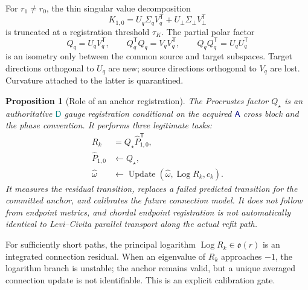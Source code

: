 \documentclass[10pt,twocolumn]{article}
\newtheorem{proposition}[theorem]{Proposition}
\theoremstyle{definition}
\theoremstyle{remark}
\newcommand{\Log}{\operatorname{Log}}
\newcommand{\status}[2]{\textcolor{#1}{\ensuremath{\boxed{\mathsf{#2}}}}}
\begin{document}
For $r_1\ne r_0$, the thin singular value decomposition
\begin{equation}
 K_{1,0}=U_q\Sigma_qV_q^{\mathsf T}+U_\perp\Sigma_\perp V_\perp^{\mathsf T}
 \label{eq:rectsvd}
\end{equation}
is truncated at a registration threshold $\tau_K$.  The partial polar factor
\begin{equation}
 Q_q=U_qV_q^{\mathsf T},\qquad
 Q_q^{\mathsf T}Q_q=V_qV_q^{\mathsf T},\qquad
 Q_qQ_q^{\mathsf T}=U_qU_q^{\mathsf T}
 \label{eq:partialpolar}
\end{equation}
is an isometry only between the common source and target subspaces.  Target directions orthogonal to $U_q$ are new; source directions orthogonal to $V_q$ are lost.  Curvature attached to the latter is quarantined.

\begin{proposition}[Role of an anchor registration]
The Procrustes factor $Q_\star$ is an authoritative \status{teal}{D} gauge registration conditional on the acquired \status{navy}{A} cross block and the phase convention.  It performs three legitimate tasks:
\begin{align}
 R_k&=Q_\star\widehat P_{1,0}^{\mathsf T},\nonumber\\
 \widehat P_{1,0}&\leftarrow Q_\star,\nonumber\\
 \widehat\omega&\leftarrow
 \operatorname{Update}(\widehat\omega,\Log R_k,c_k).
 \label{eq:anchorcalibration}
\end{align}
It measures the residual transition, replaces a failed predicted transition for the committed anchor, and calibrates the future connection model.  It does not follow from endpoint metrics, and chordal endpoint registration is not automatically identical to Levi--Civita parallel transport along the actual refit path.
\end{proposition}

For sufficiently short paths, the principal logarithm $\Log R_k\in\mathfrak o(r)$ is an integrated connection residual.  When an eigenvalue of $R_k$ approaches $-1$, the logarithm branch is unstable; the anchor remains valid, but a unique averaged connection update is not identifiable.  This is an explicit calibration gate.
\end{document}

